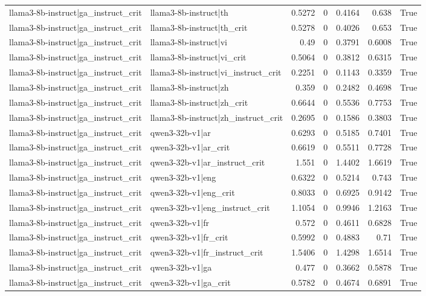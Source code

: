 \begin{table}
\begin{tabular}{l l r r r r l}
llama3-8b-instruct|ga_instruct_crit & llama3-8b-instruct|th & 0.5272 & 0 & 0.4164 & 0.638 & True \\
llama3-8b-instruct|ga_instruct_crit & llama3-8b-instruct|th_crit & 0.5278 & 0 & 0.4026 & 0.653 & True \\
llama3-8b-instruct|ga_instruct_crit & llama3-8b-instruct|vi & 0.49 & 0 & 0.3791 & 0.6008 & True \\
llama3-8b-instruct|ga_instruct_crit & llama3-8b-instruct|vi_crit & 0.5064 & 0 & 0.3812 & 0.6315 & True \\
llama3-8b-instruct|ga_instruct_crit & llama3-8b-instruct|vi_instruct_crit & 0.2251 & 0 & 0.1143 & 0.3359 & True \\
llama3-8b-instruct|ga_instruct_crit & llama3-8b-instruct|zh & 0.359 & 0 & 0.2482 & 0.4698 & True \\
llama3-8b-instruct|ga_instruct_crit & llama3-8b-instruct|zh_crit & 0.6644 & 0 & 0.5536 & 0.7753 & True \\
llama3-8b-instruct|ga_instruct_crit & llama3-8b-instruct|zh_instruct_crit & 0.2695 & 0 & 0.1586 & 0.3803 & True \\
llama3-8b-instruct|ga_instruct_crit & qwen3-32b-v1|ar & 0.6293 & 0 & 0.5185 & 0.7401 & True \\
llama3-8b-instruct|ga_instruct_crit & qwen3-32b-v1|ar_crit & 0.6619 & 0 & 0.5511 & 0.7728 & True \\
llama3-8b-instruct|ga_instruct_crit & qwen3-32b-v1|ar_instruct_crit & 1.551 & 0 & 1.4402 & 1.6619 & True \\
llama3-8b-instruct|ga_instruct_crit & qwen3-32b-v1|eng & 0.6322 & 0 & 0.5214 & 0.743 & True \\
llama3-8b-instruct|ga_instruct_crit & qwen3-32b-v1|eng_crit & 0.8033 & 0 & 0.6925 & 0.9142 & True \\
llama3-8b-instruct|ga_instruct_crit & qwen3-32b-v1|eng_instruct_crit & 1.1054 & 0 & 0.9946 & 1.2163 & True \\
llama3-8b-instruct|ga_instruct_crit & qwen3-32b-v1|fr & 0.572 & 0 & 0.4611 & 0.6828 & True \\
llama3-8b-instruct|ga_instruct_crit & qwen3-32b-v1|fr_crit & 0.5992 & 0 & 0.4883 & 0.71 & True \\
llama3-8b-instruct|ga_instruct_crit & qwen3-32b-v1|fr_instruct_crit & 1.5406 & 0 & 1.4298 & 1.6514 & True \\
llama3-8b-instruct|ga_instruct_crit & qwen3-32b-v1|ga & 0.477 & 0 & 0.3662 & 0.5878 & True \\
llama3-8b-instruct|ga_instruct_crit & qwen3-32b-v1|ga_crit & 0.5782 & 0 & 0.4674 & 0.6891 & True \\

\end{tabular}
\end{table}
